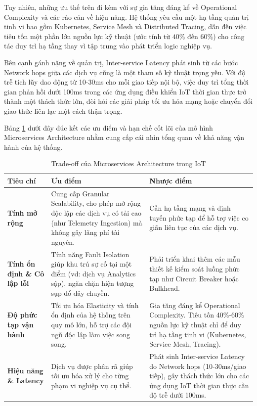 Tuy nhiên, những ưu thế trên đi kèm với sự gia tăng đáng kể về Operational Complexity và các rào cản về hiệu năng. Hệ thống yêu cầu một hạ tầng quản trị tinh vi bao gồm Kubernetes, Service Mesh và Distributed Tracing, dẫn đến việc tiêu tốn một phần lớn nguồn lực kỹ thuật (ước tính từ $40\%$ đến $60\%$) cho công tác duy trì hạ tầng thay vì tập trung vào phát triển logic nghiệp vụ.

Bên cạnh gánh nặng về quản trị, Inter-service Latency phát sinh từ các bước Network hops giữa các dịch vụ cũng là một tham số kỹ thuật trọng yếu. Với độ trễ tích lũy dao động từ 10-30ms cho mỗi giao tiếp nội bộ, việc duy trì tổng thời gian phản hồi dưới 100ms trong các ứng dụng điều khiển IoT thời gian thực trở thành một thách thức lớn, đòi hỏi các giải pháp tối ưu hóa mạng hoặc chuyển đổi giao thức liên lạc một cách thận trọng.

Bảng \ref{tab:microservices-tradeoffs} dưới đây đúc kết các ưu điểm và hạn chế cốt lõi của mô hình Microservices Architecture nhằm cung cấp cái nhìn tổng quan về khả năng vận hành của hệ thống.

\begin{table}[H]
\centering
\caption{Trade-off của Microservices Architecture trong IoT}
\label{tab:microservices-tradeoffs}
\begin{tabular}{|p{3.5cm}|p{5.5cm}|p{5.5cm}|}
\hline
\textbf{Tiêu chí} & \textbf{Ưu điểm} & \textbf{Nhược điểm} \\ \hline
\textbf{Tính mở rộng} & Cung cấp Granular Scalability, cho phép mở rộng độc lập các dịch vụ có tải cao (như Telemetry Ingestion) mà không gây lãng phí tài nguyên. & Cần hạ tầng mạng và định tuyến phức tạp để hỗ trợ việc co giãn liên tục của các dịch vụ. \\ \hline
\textbf{Tính ổn định \& Cô lập lỗi} & Tính năng Fault Isolation giúp khu trú sự cố tại một điểm (vd: dịch vụ Analytics sập), ngăn chặn hiện tượng sụp đổ dây chuyền. & Phải triển khai thêm các mẫu thiết kế kiểm soát luồng phức tạp như Circuit Breaker hoặc Bulkhead. \\ \hline
\textbf{Độ phức tạp vận hành} & Tối ưu hóa Elasticity và tính ổn định của hệ thống trên quy mô lớn, hỗ trợ các đội ngũ độc lập làm việc song song. & Gia tăng đáng kể Operational Complexity. Tiêu tốn 40\%-60\% nguồn lực kỹ thuật chỉ để duy trì hạ tầng tinh vi (Kubernetes, Service Mesh, Tracing). \\ \hline
\textbf{Hiệu năng \& Latency} & Dịch vụ được phân rã giúp tối ưu hóa xử lý cho từng phạm vi nghiệp vụ cụ thể. & Phát sinh Inter-service Latency do Network hops (10-30ms/giao tiếp), gây thách thức lớn cho các ứng dụng IoT thời gian thực cần độ trễ dưới 100ms. \\ \hline
\end{tabular}
\end{table}

